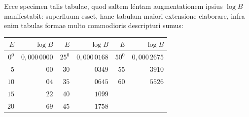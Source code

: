 Ecce specimen talis tabulae, quod saltem léntam augmentationem ipsius $\log B$ manifestabit: superfluum esset, hanc tabulam maiori extensione elaborare, infra enim tabulas formae multo commodioris descripturi sumus:
\begin{center}
\begin{tabular}{|r|r||r|r||r|r|}
\hline
$E$ & $\log B$ & $E$ & $\log B$ & $E$ & $\log B$\\
\hline
$0^0$ & $0{,}000\,0000$ & $25^0$ & $0{,}000\,0168$ & $50^0$ & $0{,}000\,2675$\\
$5$ & $00$ & $30$ & $0349$ & $55$ & $3910$\\
$10$ & $04$ & $35$ & $0645$ & $60$ & $5526$\\
$15$ & $22$ & $40$ & $1099$ & & \\
$20$ & $69$ & $45$ & $1758$ & & \\
\hline
\end{tabular}
\end{center}
